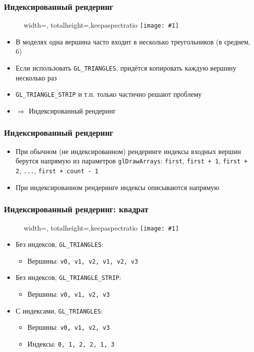 \documentclass{beamer}
\newcommand{\slideimage}[1]{
  \begin{figure}
    \begin{adjustbox}{width=\textwidth, totalheight=\textheight-2\baselineskip-2\baselineskip,keepaspectratio}
      \texttt{[image: \#1]}
    \end{adjustbox}
  \end{figure}
}
\begin{document}
\begin{frame}[fragile]
\frametitle{Индексированный рендеринг}
\slideimage{spheres.png}
\begin{itemize}
\item В моделях одна вершина часто входит в несколько треугольников (в среднем, 6)
\pause
\item Если использовать \verb|GL_TRIANGLES|, придётся копировать каждую вершину несколько раз
\pause
\item \verb|GL_TRIANGLE_STRIP| и т.п. только частично решают проблему
\pause
\item \begin{math}\Rightarrow\end{math} Индексированный рендеринг
\end{itemize}
\end{frame}

\begin{frame}[fragile]
\frametitle{Индексированный рендеринг}
\begin{itemize}
\item При обычном (не индексированном) рендеринге индексы входных вершин берутся напрямую из параметров \verb|glDrawArrays|: \verb|first|, \verb|first + 1|, \verb|first + 2|, \verb|...|, \verb|first + count - 1|
\pause
\item При индексированном рендеринге индексы описываются напрямую
\end{itemize}
\end{frame}

\begin{frame}[fragile]
\frametitle{Индексированный рендеринг: квадрат}
\slideimage{quad.png}
\pause
\begin{itemize}
\item Без индексов, \verb|GL_TRIANGLES|:
\begin{itemize}
\item Вершины: \verb|v0, v1, v2, v1, v2, v3|
\end{itemize}
\pause
\item Без индексов, \verb|GL_TRIANGLE_STRIP|:
\begin{itemize}
\item Вершины: \verb|v0, v1, v2, v3|
\end{itemize}
\pause
\item С индексами, \verb|GL_TRIANGLES|:
\begin{itemize}
\item Вершины: \verb|v0, v1, v2, v3|
\item Индексы: \verb|0, 1, 2, 2, 1, 3|
\end{itemize}
\end{itemize}
\end{frame}
\end{document}
